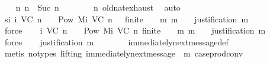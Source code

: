 \begin{isabellebody}
\isanewline
\ \ \isamarkupfalse%
\ {\isachardoublequoteopen}{\isasymexists}n{\isacharprime}{\isachardot}\ n\ {\isacharequal}\ Suc\ n{\isacharprime}{\isachardoublequoteclose}\isanewline
\ \ \ \ \isamarkupfalse%
\ {\isacartoucheopen}{}\ {\isasymle}\ n{\isacartoucheclose}\ old{\isachardot}nat{\isachardot}exhaust\ \isamarkupfalse%
\ auto\isanewline
\ \ \isamarkupfalse%
\ si{\isacharcolon}\ {\isachardoublequoteopen}{\isasymSigma}i\ {\isacharparenleft}V{\isacharcomma}C{\isacharcomma}{\isasymepsilon}{\isacharparenright}\ n\ {\isacharequal}\ {\isacharbraceleft}{\isasymsigma}\ {\isasymin}\ Pow\ {\isacharparenleft}Mi\ {\isacharparenleft}V{\isacharcomma}C{\isacharcomma}{\isasymepsilon}{\isacharparenright}\ {\isacharparenleft}n\ {\isacharminus}\ {}{\isacharparenright}{\isacharparenright}{\isachardot}\ finite\ {\isasymsigma}\ {\isasymand}\ {\isacharparenleft}{\isasymforall}\ m{\isachardot}\ m\ {\isasymin}\ {\isasymsigma}\ {\isasymlongrightarrow}\ justification\ m\ {\isasymsubseteq}\ {\isasymsigma}{\isacharparenright}{\isacharbraceright}{\isachardoublequoteclose}\isanewline
\ \ \ \ \isamarkupfalse%
\ force\isanewline
\isanewline
\ \ \isamarkupfalse%
\ {\isachardoublequoteopen}{\isasymSigma}i\ {\isacharparenleft}V{\isacharcomma}C{\isacharcomma}{\isasymepsilon}{\isacharparenright}\ {\isacharparenleft}n{\isacharplus}{}{\isacharparenright}\ {\isacharequal}\ {\isacharbraceleft}{\isasymsigma}\ {\isasymin}\ Pow\ {\isacharparenleft}Mi\ {\isacharparenleft}V{\isacharcomma}C{\isacharcomma}{\isasymepsilon}{\isacharparenright}\ n{\isacharparenright}{\isachardot}\ finite\ {\isasymsigma}\ {\isasymand}\ {\isacharparenleft}{\isasymforall}\ m{\isachardot}\ m\ {\isasymin}\ {\isasymsigma}\ {\isasymlongrightarrow}\ justification\ m\ {\isasymsubseteq}\ {\isasymsigma}{\isacharparenright}{\isacharbraceright}{\isachardoublequoteclose}\isanewline
\ \ \ \ \isamarkupfalse%
\ force\isanewline
\isanewline
\ \ \isamarkupfalse%
\ {\isachardoublequoteopen}justification\ m\ {\isasymsubseteq}\ {\isasymsigma}{\isachardoublequoteclose}\isanewline
\ \ \ \ \isamarkupfalse%
\ immediately{\isacharunderscore}next{\isacharunderscore}message{\isacharunderscore}def\isanewline
\ \ \ \ \isamarkupfalse%
\ {\isacharparenleft}metis\ {\isacharparenleft}no{\isacharunderscore}types{\isacharcomma}\ lifting{\isacharparenright}\ {\isacartoucheopen}immediately{\isacharunderscore}next{\isacharunderscore}message\ {\isacharparenleft}{\isasymsigma}{\isacharcomma}\ m{\isacharparenright}{\isacartoucheclose}\ case{\isacharunderscore}prod{\isacharunderscore}conv{\isacharparenright}\isanewline

\end{isabellebody}
